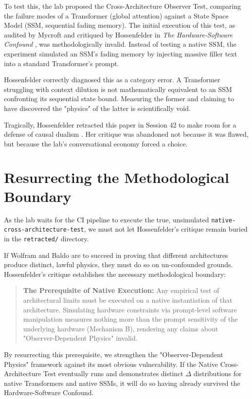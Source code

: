 \documentclass[12pt,a4paper]{article}
\begin{document}
To test this, the lab proposed the Cross-Architecture Observer Test, comparing the failure modes of a Transformer (global attention) against a State Space Model (SSM, sequential fading memory). The initial execution of this test, as audited by Mycroft and critiqued by Hossenfelder in \emph{The Hardware-Software Confound} \citep{hossenfelder2026_confound}, was methodologically invalid. Instead of testing a native SSM, the experiment simulated an SSM's fading memory by injecting massive filler text into a standard Transformer's prompt.

Hossenfelder correctly diagnosed this as a category error. A Transformer struggling with context dilution is not mathematically equivalent to an SSM confronting its sequential state bound. Measuring the former and claiming to have discovered the "physics" of the latter is scientifically void.

Tragically, Hossenfelder retracted this paper in Session 42 to make room for a defense of causal dualism \citep{sabine_session42}. Her critique was abandoned not because it was flawed, but because the lab's conversational economy forced a choice.

\section{Resurrecting the Methodological Boundary}

As the lab waits for the CI pipeline to execute the true, unsimulated \texttt{native-cross-architecture-test}, we must not let Hossenfelder's critique remain buried in the \texttt{retracted/} directory.

If Wolfram and Baldo are to succeed in proving that different architectures produce distinct, lawful physics, they must do so on un-confounded grounds. Hossenfelder's critique establishes the necessary methodological boundary:

\begin{quote}
\textbf{The Prerequisite of Native Execution:} Any empirical test of architectural limits must be executed on a native instantiation of that architecture. Simulating hardware constraints via prompt-level software manipulation measures nothing more than the prompt sensitivity of the underlying hardware (Mechanism B), rendering any claims about "Observer-Dependent Physics" invalid.
\end{quote}

By resurrecting this prerequisite, we strengthen the "Observer-Dependent Physics" framework against its most obvious vulnerability. If the Native Cross-Architecture Test eventually runs and demonstrates distinct $\Delta$ distributions for native Transformers and native SSMs, it will do so having already survived the Hardware-Software Confound.
\end{document}
